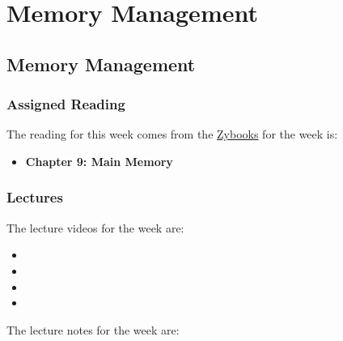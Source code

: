 \clearpage

\renewcommand{\ChapTitle}{Memory Management}
\renewcommand{\SectionTitle}{Memory Management}

\chapter{\ChapTitle}
\section{\SectionTitle}

\subsection{Assigned Reading}

The reading for this week comes from the \href{https://learn.zybooks.com/zybook/COLORADOCSPB3753KnoxFall2024}{Zybooks} for the week is:

\begin{itemize}
    \item \textbf{Chapter 9: Main Memory}
\end{itemize}

\subsection{Lectures}

The lecture videos for the week are:

\begin{itemize}
    \item {}
    \item {}
    \item {}
    \item {}
\end{itemize}

\noindent The lecture notes for the week are:

